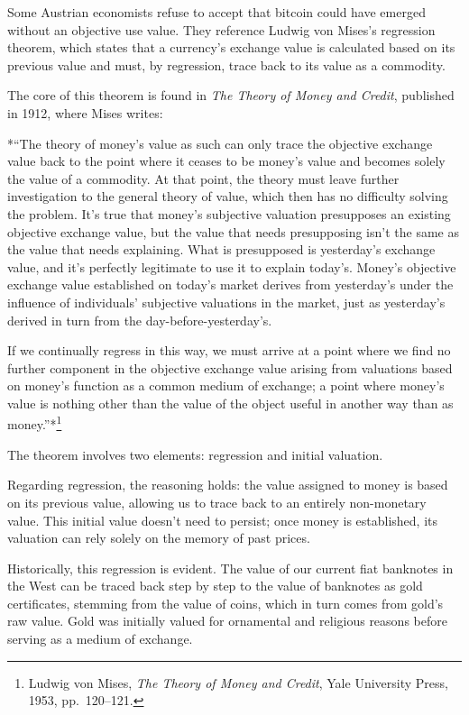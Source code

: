 \documentclass[
  a5paper,
  smalldemyvopaper,10pt,twoside,onecolumn,openright,extrafontsizes,hidelinks]{memoir}
\begin{document}
Some Austrian economists refuse to accept that bitcoin could have
emerged without an objective use value. They reference Ludwig von
Mises's regression theorem, which states that a currency's exchange
value is calculated based on its previous value and must, by regression,
trace back to its value as a commodity.

The core of this theorem is found in \emph{The Theory of Money and
Credit}, published in 1912, where Mises writes:

*``The theory of money's value as such can only trace the objective
exchange value back to the point where it ceases to be money's value and
becomes solely the value of a commodity. At that point, the theory must
leave further investigation to the general theory of value, which then
has no difficulty solving the problem. It's true that money's subjective
valuation presupposes an existing objective exchange value, but the
value that needs presupposing isn't the same as the value that needs
explaining. What is presupposed is yesterday's exchange value, and it's
perfectly legitimate to use it to explain today's. Money's objective
exchange value established on today's market derives from yesterday's
under the influence of individuals' subjective valuations in the market,
just as yesterday's derived in turn from the day-before-yesterday's.

If we continually regress in this way, we must arrive at a point where
we find no further component in the objective exchange value arising
from valuations based on money's function as a common medium of
exchange; a point where money's value is nothing other than the value of
the object useful in another way than as money.''*\footnote{Ludwig von
  Mises, \emph{The Theory of Money and Credit}, Yale University Press,
  1953, pp.~120--121.}

The theorem involves two elements: regression and initial valuation.

Regarding regression, the reasoning holds: the value assigned to money
is based on its previous value, allowing us to trace back to an entirely
non-monetary value. This initial value doesn't need to persist; once
money is established, its valuation can rely solely on the memory of
past prices.

Historically, this regression is evident. The value of our current fiat
banknotes in the West can be traced back step by step to the value of
banknotes as gold certificates, stemming from the value of coins, which
in turn comes from gold's raw value. Gold was initially valued for
ornamental and religious reasons before serving as a medium of exchange.
\end{document}
